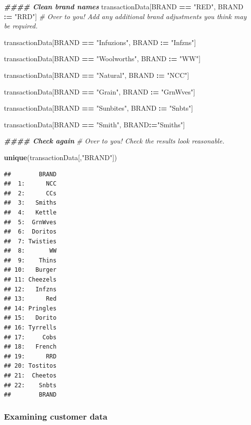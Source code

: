 \documentclass[
]{article}
\newenvironment{Shaded}{\begin{snugshade}}{\end{snugshade}}
\newcommand{\CommentTok}[1]{\textcolor[rgb]{0.56,0.35,0.01}{\textit{#1}}}
\newcommand{\DocumentationTok}[1]{\textcolor[rgb]{0.56,0.35,0.01}{\textbf{\textit{#1}}}}
\newcommand{\FunctionTok}[1]{\textcolor[rgb]{0.13,0.29,0.53}{\textbf{#1}}}
\newcommand{\NormalTok}[1]{#1}
\newcommand{\SpecialCharTok}[1]{\textcolor[rgb]{0.81,0.36,0.00}{\textbf{#1}}}
\newcommand{\StringTok}[1]{\textcolor[rgb]{0.31,0.60,0.02}{#1}}
\begin{document}
\begin{Shaded}
\begin{Highlighting}[]
\DocumentationTok{\#\#\#\# Clean brand names}
\NormalTok{transactionData[BRAND }\SpecialCharTok{==} \StringTok{"RED"}\NormalTok{, BRAND }\SpecialCharTok{:=} \StringTok{"RRD"}\NormalTok{]}
\CommentTok{\# Over to you! Add any additional brand adjustments you think may be required.}

\NormalTok{transactionData[BRAND }\SpecialCharTok{==} \StringTok{"Infuzions"}\NormalTok{, BRAND }\SpecialCharTok{:=} \StringTok{"Infzns"}\NormalTok{]}

\NormalTok{transactionData[BRAND }\SpecialCharTok{==} \StringTok{"Woolworths"}\NormalTok{, BRAND }\SpecialCharTok{:=} \StringTok{"WW"}\NormalTok{]}

\NormalTok{transactionData[BRAND }\SpecialCharTok{==} \StringTok{"Natural"}\NormalTok{, BRAND }\SpecialCharTok{:=} \StringTok{"NCC"}\NormalTok{]}

\NormalTok{transactionData[BRAND }\SpecialCharTok{==} \StringTok{"Grain"}\NormalTok{, BRAND }\SpecialCharTok{:=} \StringTok{"GrnWves"}\NormalTok{]}

\NormalTok{transactionData[BRAND }\SpecialCharTok{==} \StringTok{"Sunbites"}\NormalTok{, BRAND }\SpecialCharTok{:=} \StringTok{"Snbts"}\NormalTok{]}

\NormalTok{transactionData[BRAND }\SpecialCharTok{==} \StringTok{"Smith"}\NormalTok{, BRAND}\SpecialCharTok{:=}\StringTok{"Smiths"}\NormalTok{]}

\DocumentationTok{\#\#\#\# Check again}
\CommentTok{\# Over to you! Check the results look reasonable.}

\FunctionTok{unique}\NormalTok{(transactionData[,}\StringTok{"BRAND"}\NormalTok{])}
\end{Highlighting}
\end{Shaded}

\begin{verbatim}
##        BRAND
##  1:      NCC
##  2:      CCs
##  3:   Smiths
##  4:   Kettle
##  5:  GrnWves
##  6:  Doritos
##  7: Twisties
##  8:       WW
##  9:    Thins
## 10:   Burger
## 11: Cheezels
## 12:   Infzns
## 13:      Red
## 14: Pringles
## 15:   Dorito
## 16: Tyrrells
## 17:     Cobs
## 18:   French
## 19:      RRD
## 20: Tostitos
## 21:  Cheetos
## 22:    Snbts
##        BRAND
\end{verbatim}

\hypertarget{examining-customer-data}{%
\subsubsection{Examining customer data}\label{examining-customer-data}}
\end{document}
